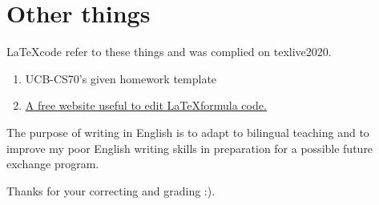 \documentclass[11pt]{article}  %
\begin{document}
\section*{Other things}

\LaTeX \space code refer to these things and was complied on texlive2020.
\begin{enumerate}
    \item  UCB-CS70's given homework template 
    \item  \href{https://www.latexlive.com}{A free website useful to edit \LaTeX \space formula code.}
\end{enumerate}

The purpose of writing in English is to adapt to bilingual teaching and to improve my poor English 
writing skills in preparation for a possible future exchange program. 

Thanks for your correcting and grading :).
\end{document}
